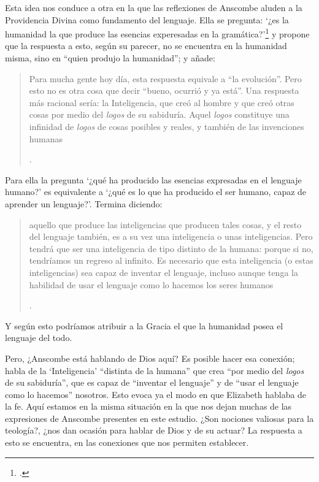 Esta idea nos conduce a otra en la que las reflexiones de Anscombe aluden a la Providencia Divina como fundamento del lenguaje. Ella se pregunta: \enquote*{¿es la humanidad la que produce las esencias experesadas en la gramática?}\footnote{\Cite[Cf.][72]{torralbaynubiola2005fayeh:esencia}.} y propone que la respuesta a esto, según su parecer, no se encuentra en la humanidad misma, sino en \enquote{quien produjo la humanidad}; y añade: \blockquote[{\Cite[73]{torralbaynubiola2005fayeh:esencia}}.]{Para mucha gente hoy día, esta respuesta equivale a ``la evolución''. Pero esto no es otra cosa que decir ``bueno, ocurrió y ya está''. Una respuesta más racional sería: la Inteligencia, que creó al hombre y que creó otras cosas por medio del \emph{logos} de su sabiduría. Aquel \emph{logos} constituye una infinidad de \emph{logos} de cosas posibles y reales, y también de las invenciones humanas}. Para ella la pregunta \enquote*{¿qué ha producido las esencias expresadas en el lenguaje humano?} es equivalente a \enquote*{¿qué es lo que ha producido el ser humano, capaz de aprender un lenguaje?}. Termina diciendo: \blockquote[{\Cite[74]{torralbaynubiola2005fayeh:esencia}}.]{aquello que produce las inteligencias que producen tales cosas, y el resto del lenguaje también, es a su vez una inteligencia o unas inteligencias. Pero tendrá que ser una inteligencia de tipo distinto de la humana: porque si no, tendríamos un regreso al infinito. Es necesario que esta inteligencia (o estas inteligencias) sea capaz de inventar el lenguaje, incluso aunque tenga la habilidad de usar el lenguaje como lo hacemos los seres humanos}. Y según esto podríamos atribuir a la Gracia el que la humanidad posea el lenguaje del todo.

Pero, ¿Anscombe está hablando de Dios aquí? Es posible hacer esa conexión; habla de la `Inteligencia' ``distinta de la humana'' que crea ``por medio del \emph{logos} de su sabiduría'', que es capaz de ``inventar el lenguaje'' y de ``usar el lenguaje como lo hacemos'' nosotros. Esto evoca ya el modo en que Elizabeth hablaba de la fe. Aquí estamos en la misma situación en la que nos dejan muchas de las expresiones de Anscombe presentes en este estudio. ¿Son nociones valiosas para la teología?, ¿nos dan ocasión para hablar de Dios y de su actuar? La respuesta a esto se encuentra, en las conexiones que nos permiten establecer.

